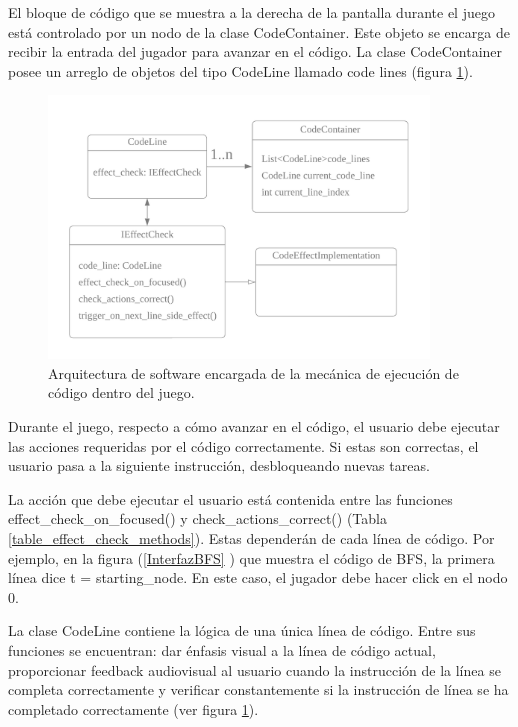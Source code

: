 El bloque de código que se muestra a la derecha de la pantalla durante el juego está controlado por un nodo de la clase CodeContainer. Este objeto se encarga de recibir la entrada del jugador para avanzar en el código. La clase CodeContainer posee un arreglo de objetos del tipo CodeLine llamado code lines (figura \ref{CodeLinesArchitecture}).

\begin{figure}[h]
	\centering
	\includegraphics[width=0.9\textwidth]{imagenes/ArquitecturaSoftwareClasesNiveles.png}
	\caption{Arquitectura de software encargada de la mecánica de ejecución de código dentro del juego.}
	\label{CodeLinesArchitecture}
\end{figure}

Durante el juego, respecto a cómo avanzar en el código, el usuario debe ejecutar las acciones requeridas por el código correctamente. Si estas son correctas, el usuario pasa a la siguiente instrucción, desbloqueando nuevas tareas.

La acción que debe ejecutar el usuario está contenida entre las funciones effect\_check\_on\_focused() y check\_actions\_correct() (Tabla \ref{table_effect_check_methods}). Estas dependerán de cada línea de código. Por ejemplo, en la figura (\ref{InterfazBFS} ) que muestra el código de BFS, la primera línea dice t = starting\_node. En este caso, el jugador debe hacer click en el nodo 0.

La clase CodeLine contiene la lógica de una única línea de código. Entre sus funciones se encuentran: dar énfasis visual a la línea de código actual, proporcionar feedback audiovisual al usuario cuando la instrucción de la línea se completa correctamente y verificar constantemente si la instrucción de línea se ha completado correctamente (ver figura \ref{CodeLinesArchitecture}).


